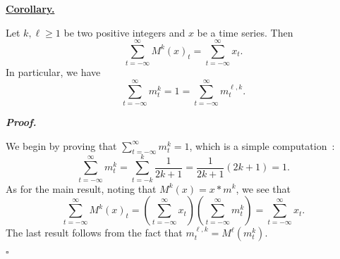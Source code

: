\documentclass[11 pt]{article}
\newcommand{\1}{\operatorname{\mathbb I}}
\newcounter{env} %
\newenvironment{abb} %
{
	\begin{mdframed}[bottomline=false,topline=false,leftline=false,rightline=false,nobreak,leftmargin=-10 pt,rightmargin=0 pt,skipabove=0 pt,skipbelow=0 pt]
}
{
	\end{mdframed}
}
\newenvironment{corh}
{\par
	\noindent \begin{abb} \textbf{\underline{Corollary.}} \par
	\nopagebreak%
	\par
	\itshape%
}
{%
	\par
	\end{abb}
}
\renewenvironment{proof}
{\par
	\begin{mdframed}[skipabove=12 pt,bottomline=false,topline=false,rightline=false]%
	\noindent \textit{\textbf{Proof.}} 
}
{%
	\end{mdframed}\par
	\begin{flushright} \vspace{-35 pt} $\square$ \end{flushright}
	\vspace{-20 pt}
}
\begin{document}
\begin{corh}
    Let $k,\ell \ge 1$ be two positive integers and $x$ be a time series. Then
    \[
        \sum_{t=-\infty}^{\infty} M^k(x)_t = \sum_{t=-\infty}^{\infty} x_t.
    \]
    In particular, we have
    \[
        \sum_{t=-\infty}^{\infty} m_t^k = 1 = \sum_{t=-\infty}^{\infty} m_t^{\ell,k}.
    \]
\end{corh}

\begin{proof}
    We begin by proving that $\sum_{t=-\infty}^{\infty} m_t^k = 1$, which is a simple computation~:
    \[
        \sum_{t=-\infty}^{\infty} m_t^k = \sum_{t=-k}^k \frac 1{2k+1} = \frac 1{2k+1} \left(2k+1\right) = 1.
    \]
    As for the main result, noting that $M^k(x) = x * m^k$, we see that
    \[
        \sum_{t=-\infty}^{\infty} M^k(x)_t = \left(\sum_{t=-\infty}^{\infty} x_t\right)\left(\sum_{t=-\infty}^{\infty} m_t^k\right) = \sum_{t=-\infty}^{\infty} x_t.
    \]
    The last result follows from the fact that $m^{\ell,k}_t = M^{\ell}(m^k_t)$.
\end{proof} 
\end{document}
